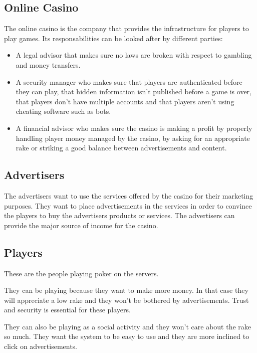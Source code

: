 \documentclass[a4paper,11pt]{report}
\begin{document}
\subsection{Online Casino}
The online casino is the company that provides the infrastructure for players to play games. Its responsabilities can be looked after by different parties:
\begin{itemize}
 \item A legal advisor that makes sure no laws are broken with respect to gambling and money transfers.
 \item A security manager who makes sure that players are authenticated before they can play, that hidden information isn't published before a game is over, that players don't have multiple accounts and that players aren't using cheating software such as bots.
 \item A financial advisor who makes sure the casino is making a profit by properly handling player money managed by the casino, by asking for an appropriate rake or striking a good balance between advertisements and content.
\end{itemize}


\subsection{Advertisers}
The advertisers want to use the services offered by the casino for their marketing purposes. They 
want to place advertisements in the services in order to convince the players to buy the 
advertisers products or services. The advertisers can provide the major source of income for the casino.

\subsection{Players}
These are the people playing poker on the servers. 

They can be playing because they want to make more money. In that case they will appreciate a low rake and they won't be bothered by advertisements. Trust and security is essential for these players.

They can also be playing as a social activity and they won't care about the rake so much. They want the system to be easy to use and they are more inclined to click on advertisements.
\end{document}
